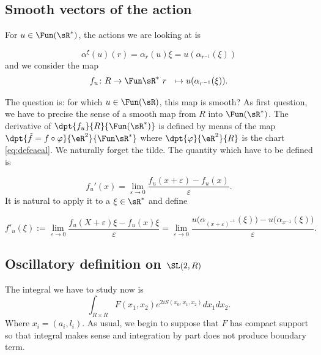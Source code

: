 \subsection{Smooth vectors of the action}

For $u\in \Fun(\sR^*)$, the actions we are looking at is

\[ 
  \alpha^{\xi}(u)(r)=\alpha_r(u)\xi=u(\alpha_{r^{-1}}(\xi))
\]
and we consider the map 
		\begin{equation}
		\begin{aligned}
			f_u \colon R &\to \Fun\sR^*\
			r&\mapsto u(\alpha_{r^{-1}}(\xi)).
		\end{aligned}
	\end{equation}	

 The question is: for which $u\in\Fun(\sR)$, this map is smooth? As first question, we have to precise the sense of a smooth map from $R$ into $\Fun(\sR^*)$. The derivative of $\dpt{f_u}{R}{\Fun(\sR^*)}$ is defined by means of the map $\dpt{\tilde f=f\circ\varphi}{\eR^2}{\Fun\sR^*}$ where $\dpt{\varphi}{\eR^2}{R}$ is the chart \eqref{eq:defeaeal}. We naturally forget the tilde. The quantity which have to be defined is


\[ 
 f_u'(x)=\lim_{\varepsilon\to 0}\frac{f_u(x+\varepsilon)-f_u(x)}{\varepsilon}. 
\]
It is natural to apply it to a $\xi\in\sR^*$ and define

\begin{equation}
f'_u(\xi):=\lim_{\varepsilon\to 0}\frac{f_u(X+\varepsilon)\xi-f_u(x)\xi}{\varepsilon}
	=\lim_{\varepsilon\to 0}\frac{u\big( \alpha_{(x+\varepsilon)^{-1}}(\xi) \big)-u\big( \alpha_{x^{-1}}(\xi) \big)}{\varepsilon}.
\end{equation}



\subsection{Oscillatory definition on \texorpdfstring{$\SL(2,R)$}{SL2R}}  \label{subsec:Oscdefsl}

The integral we have to study now is
\[ 
  \int_{R\times R} F(x_1,x_2) e^{2iS(x_0,x_1,x_2)}dx_1dx_2.
\]
Where $x_i=(a_i,l_i)$. As usual, we begin to suppose that $F$ has compact support so that integral makes sense and integration by part does not produce boundary term.


